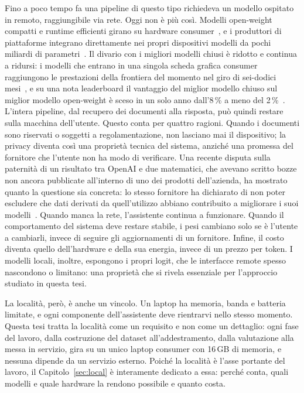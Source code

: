 Fino a poco tempo fa una pipeline di questo tipo richiedeva un modello ospitato in remoto, raggiungibile via rete. Oggi
non è più così. Modelli open-weight compatti e runtime efficienti girano su hardware consumer~\cite{llamacpp,mlx2023}, e i
produttori di piattaforme integrano direttamente nei propri dispositivi modelli da pochi miliardi di
parametri~\cite{gunter2024apple}. Il divario con i migliori modelli chiusi è ridotto e continua a ridursi: i modelli che
entrano in una singola scheda grafica consumer raggiungono le prestazioni della frontiera del momento nel giro di sei-dodici
mesi~\cite{epoch2025consumergpu}, e su una nota leaderboard il vantaggio del miglior modello chiuso sul miglior modello
open-weight è sceso in un solo anno dall'8\,\% a meno del 2\,\%~\cite{stanford2025aiindex}. L'intera pipeline, dal recupero dei documenti alla risposta, può quindi restare sulla
macchina dell'utente. Questo conta per quattro ragioni. Quando i documenti sono riservati o soggetti a regolamentazione,
non lasciano mai il dispositivo; la privacy diventa così una proprietà tecnica del sistema, anziché una promessa del
fornitore che l'utente non ha modo di verificare. Una recente disputa sulla paternità di un risultato tra OpenAI e due
matematici, che avevano scritto bozze non ancora pubblicate all'interno di uno dei prodotti dell'azienda, ha mostrato
quanto la questione sia concreta: lo stesso fornitore ha dichiarato di non poter escludere che dati derivati da
quell'utilizzo abbiano contribuito a migliorare i suoi modelli~\cite{rits2026navierstokes}. Quando manca la rete, l'assistente continua a funzionare. Quando il comportamento del
sistema deve restare stabile, i pesi cambiano solo se è l'utente a cambiarli, invece di seguire gli aggiornamenti di un
fornitore. Infine, il costo diventa quello dell'hardware e della sua energia, invece di un prezzo per token. I modelli
locali, inoltre, espongono i propri logit, che le interfacce remote spesso nascondono o limitano: una proprietà che si
rivela essenziale per l'approccio studiato in questa tesi.

La località, però, è anche un vincolo. Un laptop ha memoria, banda e batteria limitate, e ogni componente dell'assistente
deve rientrarvi nello stesso momento. Questa tesi tratta la località come un requisito e non come un dettaglio: ogni fase
del lavoro, dalla costruzione del dataset all'addestramento, dalla valutazione alla messa in servizio, gira su un unico
laptop consumer con 16\,GB di memoria, e nessuna dipende da un servizio esterno. Poiché la località è l'asse portante
del lavoro, il Capitolo~\ref{sec:local} è interamente dedicato a essa: perché conta, quali modelli e quale hardware la
rendono possibile e quanto costa.

